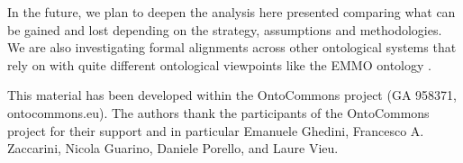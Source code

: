 \documentclass[ao]{iosart2x}
\begin{document}
In the future, we plan to deepen the analysis here presented comparing what can be gained and lost depending on the strategy, assumptions and methodologies. We are also investigating formal alignments across other ontological systems that rely on with quite different ontological viewpoints like the EMMO ontology \citep{EMMO}.


\begin{acks}
This material has been developed within the OntoCommons project (GA 958371, ontocommons.eu). The authors thank the participants of the OntoCommons project for their support and in particular Emanuele Ghedini, Francesco A. Zaccarini, Nicola Guarino, Daniele Porello, and Laure Vieu.
\end{acks}

\nocite{label} 


\end{document}
